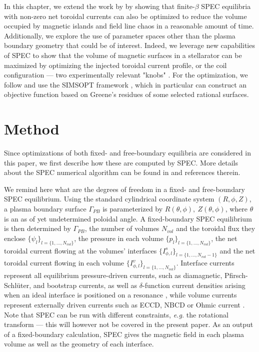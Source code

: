 In this chapter, we extend the work by \citet{Landreman2021a} by showing that finite-$\beta$ \ac{SPEC} equilibria with non-zero net toroidal currents can also be optimized to reduce the volume occupied by magnetic islands and field line chaos in a reasonable amount of time. Additionally, we explore the use of parameter spaces other than the plasma boundary geometry that could be of interest. Indeed, we leverage new capabilities of \ac{SPEC} to show that the volume of magnetic surfaces in a stellarator can be maximized by optimizing the injected toroidal current profile, or the coil configuration --- two experimentally relevant "knobs" \cite{Geiger2015}. For the optimization, we follow \citet{Landreman2021a} and use the SIMSOPT framework \cite{Landreman2021b}, which in particular can construct an objective function based on Greene's residues \cite{Greene1978} of some selected rational surfaces. 



\section{\label{sec:method}Method}

Since optimizations of both fixed- and free-boundary equilibria are considered in this paper, we first describe how these are computed by \ac{SPEC}. More details about the \ac{SPEC} numerical algorithm can be found in \citet{Hudson2012,Hudson2020c} and references therein.

We remind here what are the degrees of freedom in a fixed- and free-boundary SPEC equilibrium. Using the standard cylindrical coordinate system $(R,\phi,Z)$, a plasma boundary surface $\Gamma_{PB}$ is parameterized by $R(\theta,\phi),\ Z(\theta,\phi)$, where $\theta$ is an as of yet undetermined poloidal angle. A fixed-boundary \ac{SPEC} equilibrium is then determined by $\Gamma_{PB}$, the number of volumes $N_{vol}$ and the toroidal flux they enclose $\{\psi_{l}\}_{l=\{1,\ldots,N_{vol}\}}$, the pressure in each volume $\{p_l\}_{l=\{1,\ldots,N_{vol}\}}$, the net toroidal  current flowing at the volumes' interfaces $\{I^s_{\phi,l}\}_{l=\{1,\ldots,N_{vol}-1\}}$ and the net toroidal current flowing in each volume $\{I^v_{\phi,l}\}_{l=\{1,\ldots,N_{vol}\}}$.
Interface currents represent all equilibrium pressure-driven currents, such as diamagnetic, Pfirsch-Schl\"uter, and bootstrap currents, as well as $\delta$-function current densities arising when an ideal interface is positioned on a resonance \citep{Loizu2015}, while volume currents represent externally driven currents such as \ac{ECCD}, \ac{NBCD} or Ohmic current \citep{Baillod2021}. Note that \ac{SPEC} can be run with different constraints, \textit{e.g.} the rotational transform --- this will  however not be covered in the present paper. As an output of a fixed-boundary calculation, \ac{SPEC} gives the magnetic field in each plasma volume as well as the geometry of each interface.

